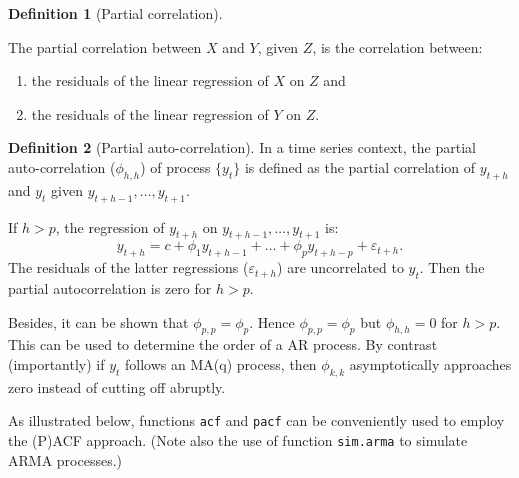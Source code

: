 \documentclass[
  12pt,
]{book}
\providecommand{\tightlist}{%
  \setlength{\itemsep}{0pt}\setlength{\parskip}{0pt}}
\theoremstyle{definition}
\newtheorem{definition}{Definition}[chapter]
\theoremstyle{definition}
\theoremstyle{definition}
\theoremstyle{definition}
\theoremstyle{remark}
\begin{document}
\begin{definition}[Partial correlation]
\protect\hypertarget{def:partialC}{}\label{def:partialC}

The partial correlation between \(X\) and \(Y\), given \(Z\), is the correlation between:

\begin{enumerate}
\def\labelenumi{\alph{enumi}.}
\tightlist
\item
  the residuals of the linear regression of \(X\) on \(Z\) and
\item
  the residuals of the linear regression of \(Y\) on \(Z\).
\end{enumerate}

\end{definition}

\begin{definition}[Partial auto-correlation]
\protect\hypertarget{def:partialAC}{}\label{def:partialAC}In a time series context, the partial auto-correlation (\(\phi_{h,h}\)) of process \(\{y_t\}\) is defined as the partial correlation of \(y_{t+h}\) and \(y_t\) given \(y_{t+h-1},\dots,y_{t+1}\).
\end{definition}

If \(h>p\), the regression of \(y_{t+h}\) on \(y_{t+h-1},\dots,y_{t+1}\) is:
\[
y_{t+h} = c + \phi_1 y_{t+h-1}+\dots+ \phi_p  y_{t+h-p} + \varepsilon_{t+h}.
\]
The residuals of the latter regressions (\(\varepsilon_{t+h}\)) are uncorrelated to \(y_t\). Then the partial autocorrelation is zero for \(h>p\).

Besides, it can be shown that \(\phi_{p,p}=\phi_p\). Hence \(\phi_{p,p}=\phi_p\) but \(\phi_{h,h}=0\) for \(h>p\). This can be used to determine the order of a AR process. By contrast (importantly) if \(y_t\) follows an MA(q) process, then \(\phi_{k,k}\) asymptotically approaches zero instead of cutting off abruptly.

As illustrated below, functions \texttt{acf} and \texttt{pacf} can be conveniently used to employ the (P)ACF approach. (Note also the use of function \texttt{sim.arma} to simulate ARMA processes.)
\end{document}
